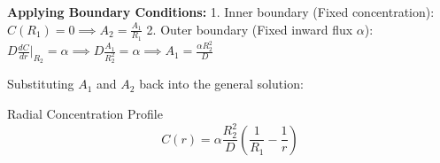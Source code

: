 \textbf{Applying Boundary Conditions:}
1. Inner boundary (Fixed concentration): $C(R_{1}) = 0 \implies A_{2} = \frac{A_{1}}{R_{1}}$
2. Outer boundary (Fixed inward flux $\alpha$): $D\frac{dC}{dr}\Big|_{R_{2}} = \alpha \implies D\frac{A_{1}}{R_{2}^{2}} = \alpha \implies A_{1} = \frac{\alpha R_{2}^{2}}{D}$

Substituting $A_1$ and $A_2$ back into the general solution:
\begin{resultboxnamed}{Radial Concentration Profile}
\[
C(r) = \alpha\frac{R_{2}^{2}}{D}\left(\frac{1}{R_{1}} - \frac{1}{r}\right)
\]
\end{resultboxnamed}

\begin{center}
\end{center}